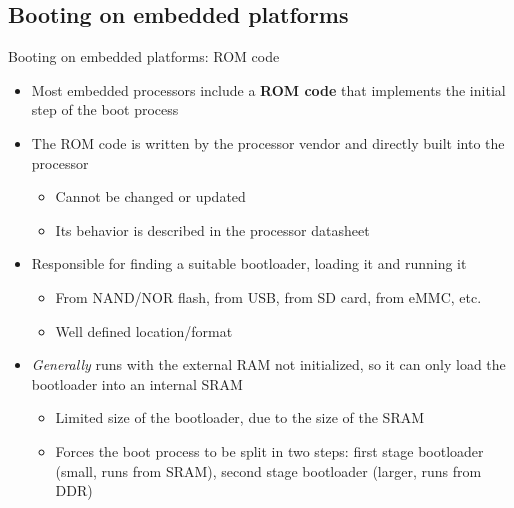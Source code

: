 \subsection{Booting on embedded platforms}

\begin{frame}{Booting on embedded platforms: ROM code}
  \begin{itemize}
  \item Most embedded processors include a {\bf ROM code} that
    implements the initial step of the boot process
  \item The ROM code is written by the processor vendor and directly
    built into the processor
    \begin{itemize}
    \item Cannot be changed or updated
    \item Its behavior is described in the processor datasheet
    \end{itemize}
  \item Responsible for finding a suitable bootloader, loading it and
    running it
    \begin{itemize}
    \item From NAND/NOR flash, from USB, from SD card, from eMMC, etc.
    \item Well defined location/format
    \end{itemize}
  \item {\em Generally} runs with the external RAM not initialized, so
    it can only load the bootloader into an internal SRAM
    \begin{itemize}
    \item Limited size of the bootloader, due to the size of the SRAM
    \item Forces the boot process to be split in two steps: first
      stage bootloader (small, runs from SRAM), second stage
      bootloader (larger, runs from DDR)
    \end{itemize}
  \end{itemize}
\end{frame}

